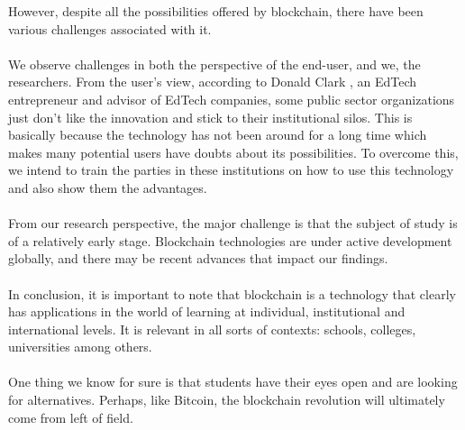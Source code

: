 However, despite all the possibilities offered by blockchain, there have been various challenges associated with it.\\\\
We observe challenges in both the perspective of the end-user, and we, the researchers. From the user’s view, according to Donald Clark \cite{art12}, an EdTech entrepreneur and advisor of EdTech companies, some public sector organizations just don’t like the innovation and stick to their institutional silos. This is basically because the technology has not been around for a long time which makes many potential users have doubts about its possibilities. To overcome this, we intend to train the parties in these institutions on how to use this technology and also show them the advantages.\\\\
From our research perspective, the major challenge is that the subject of study is of a relatively early stage. Blockchain technologies are under active development globally, and there may be recent advances that impact our findings.\\\\
In conclusion, it is important to note that blockchain is a technology that clearly has applications in the world of learning at individual, institutional and international levels. It is relevant in all sorts of contexts: schools, colleges, universities among others.\\\\
One thing we know for sure is that students have their eyes open and are looking for alternatives. Perhaps, like Bitcoin, the blockchain revolution will ultimately come from left of field.
\newpage

